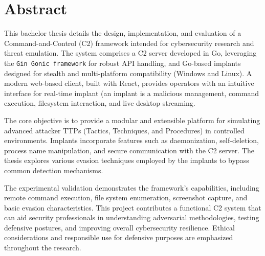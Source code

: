 \chapter*{Abstract}
\onehalfspacing
{} 

This bachelor thesis details the design, implementation, and evaluation of a Command-and-Control (C2) framework intended for cybersecurity research and threat emulation. The system comprises a C2 server developed in Go, leveraging the \verb|Gin Gonic framework| for robust API handling, and Go-based implants designed for stealth and multi-platform compatibility (Windows and Linux). A modern web-based client, built with React, provides operators with an intuitive interface for real-time implant (an implant is a malicious  management, command execution, filesystem interaction, and live desktop streaming.

The core objective is to provide a modular and extensible platform for simulating advanced attacker TTPs (Tactics, Techniques, and Procedures) in controlled environments. Implants incorporate features such as daemonization, self-deletion, process name manipulation, and secure communication with the C2 server. The thesis explores various evasion techniques employed by the implants to bypass common detection mechanisms.

The experimental validation demonstrates the framework's capabilities, including remote command execution, file system enumeration, screenshot capture, and basic evasion characteristics. This project contributes a functional C2 system that can aid security professionals in understanding adversarial methodologies, testing defensive postures, and improving overall cybersecurity resilience. Ethical considerations and responsible use for defensive purposes are emphasized throughout the research.